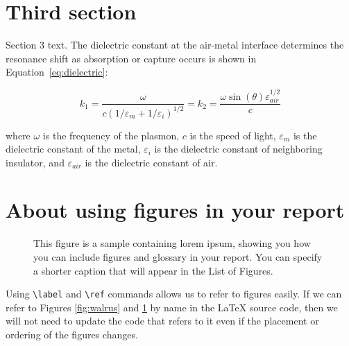 \section{Third section}
Section 3 text. The dielectric constant
at the air-metal interface determines
the resonance shift as absorption or capture occurs
is shown in Equation~\eqref{eq:dielectric}:

\begin{equation}\label{eq:dielectric}
k_1=\frac{\omega}{c({1/\varepsilon_m + 1/\varepsilon_i})^{1/2}}=k_2=\frac{\omega
\sin(\theta)\varepsilon_\mathit{air}^{1/2}}{c}
\end{equation}

\noindent
where $\omega$ is the frequency of the plasmon, $c$ is the speed of
light, $\varepsilon_m$ is the dielectric constant of the metal,
$\varepsilon_i$ is the dielectric constant of neighboring insulator,
and $\varepsilon_\mathit{air}$ is the dielectric constant of air.

\section{About using figures in your report}

\newcommand{\loremipsum}{
  \textit{แม้งเอ้ย}\par}

\begin{figure}
  \centering

  \fbox{
     \parbox{.6\textwidth}{\loremipsum}
  }


  \caption[Sample figure]{This figure is a sample containing \gls{lorem ipsum},
  showing you how you can include figures and glossary in your report.
  You can specify a shorter caption that will appear in the List of Figures.}
  \label{fig:sample-figure}
\end{figure}

Using \verb.\label. and \verb.\ref. commands allows us to refer to
figures easily. If we can refer to Figures
\ref{fig:walrus} and \ref{fig:sample-figure} by name in the {\LaTeX}
source code, then we will not need to update the code that refers to it
even if the placement or ordering of the figures changes.

